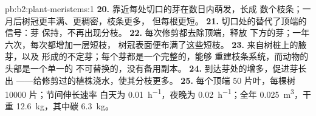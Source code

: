 \begin{solution}{pb:b2:plant-meristems:1}
\textbf{20.} 靠近每处切口的芽在数日内萌发，长成
数个枝条；一月后树冠更丰满、更稠密，枝条更多，
但每根更短。
\textbf{21.} 切口处的替代了顶端的信号：芽
保持，不再出现分枝。
\textbf{22.} 每次修剪都去除顶端，释放
下方的芽；一年六次，每次都增加一层短枝，
树冠表面便布满了这些短枝。
\textbf{23.} 来自树桩上的腋芽，以及
形成的不定芽；每个芽都是一个完整的，能够
重建枝条系统，而动物的头部是一个单一的
不可替换的，没有备用副本。
\textbf{24.} 到达芽处的增多，促进芽长出
——给修剪过的植株浇水，使其分枝更多。
\textbf{25.} 每个顶端 50 片叶，每棵树 \num{10000} 片；节间伸长速率
白天为 \qty{0.01}{h^{-1}}，夜晚为 \qty{0.02}{h^{-1}}；全年
 \qty{0.025}{m^3}，干重 \qty{12.6}{kg}，其中碳 \qty{6.3}{kg}。
\end{solution}
